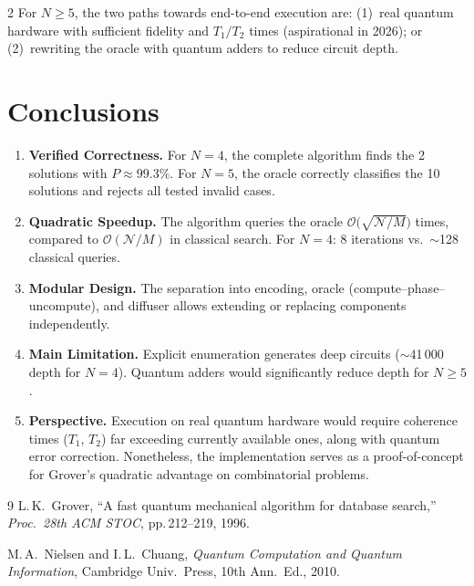 \documentclass[9pt, a4paper]{extarticle}
\newcommand{\BigO}{\mathcal{O}}
\begin{document}
\begin{multicols}{2}
For $N \geq 5$, the two paths towards end-to-end execution are: (1)~real quantum hardware with sufficient fidelity and $T_1/T_2$ times (aspirational in 2026); or (2)~rewriting the oracle with quantum adders to reduce circuit depth.

\section{Conclusions}

\begin{enumerate}
    \item \textbf{Verified Correctness.} For $N\!=\!4$, the complete algorithm finds the 2 solutions with $P \approx 99.3\%$. For $N\!=\!5$, the oracle correctly classifies the 10 solutions and rejects all tested invalid cases.

    \item \textbf{Quadratic Speedup.} The algorithm queries the oracle $\BigO\!\big(\sqrt{\mathcal{N}/M}\big)$ times, compared to $\BigO(\mathcal{N}/M)$ in classical search. For $N\!=\!4$: 8 iterations vs.\ $\sim$128 classical queries.

    \item \textbf{Modular Design.} The separation into encoding, oracle (compute--phase--uncompute), and diffuser allows extending or replacing components independently.

    \item \textbf{Main Limitation.} Explicit enumeration generates deep circuits ($\sim$41\,000 depth for $N\!=\!4$). Quantum adders would significantly reduce depth for $N\!\geq\!5$.

    \item \textbf{Perspective.} Execution on real quantum hardware would require coherence times ($T_1$, $T_2$) far exceeding currently available ones, along with quantum error correction. Nonetheless, the implementation serves as a proof-of-concept for Grover's quadratic advantage on combinatorial problems.
\end{enumerate}

\begin{thebibliography}{9}
\small
    L.\,K.~Grover,
    ``A fast quantum mechanical algorithm for database search,''
    \textit{Proc.\ 28th ACM STOC}, pp.\,212--219, 1996.

    M.\,A.~Nielsen and I.\,L.~Chuang,
    \textit{Quantum Computation and Quantum Information},
    Cambridge Univ.\ Press, 10th Ann.\ Ed., 2010.


\end{thebibliography}
\end{multicols}
\end{document}
